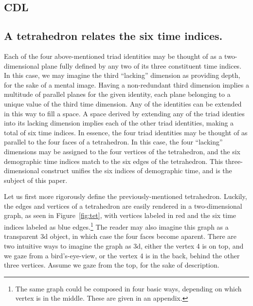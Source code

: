 \documentclass[11pt,oneside,a4paper]{article} %
\newcommand\vt[1]{\textcolor{rd}{#1}}
\newcommand\tgh[1]{\raisebox{-.25\height}{\texttt{[image: Figures/triadtable/triad\#1.pdf]}}}
\begin{document}
\subsection*{CDL \tgh{CDL}}


\subsection*{A tetrahedron relates the six time indices.}
Each of the four above-mentioned triad identities may be thought of as a
two-dimensional plane fully defined by any two of its three constituent time
indices.
In this case, we may imagine the third ``lacking'' dimension as providing
depth, for the sake of a mental image.
Having a non-redundant third dimension implies a multitude of parallel planes
for the given identity, each plane belonging to a unique value of the third time dimension. Any of the
identities can be extended in this way to fill a space. A space derived by
extending any of the triad identies into its lacking dimension implies each of the
other triad identities, making a total of six time indices. In essence, the
four triad identities may be thought of as parallel to the four faces of a
tetrahedron. In this case, the four ``lacking'' dimensions may be assigned to
the four vertices of the tetrahedron, and the six demographic time indices match
to the six edges of the tetrahedron. This three-dimensional construct
unifies the six indices of demographic time, and is the subject of this paper.

Let us first more rigorously define the previously-mentioned tetrahedron.
Luckily, the edges and vertices of a tetrahedron are easily rendered in a
two-dimensional graph, as seen in Figure~\ref{fig:tet}, with vertices labeled
in red and the six time indices labeled as blue edges.\footnote{The same graph
could be composed in four basic ways, depending on which vertex is in the
middle. These are given in an appendix.} The reader may also imagine this graph
as a transparent 3d object, in which case the four faces become aparent. There are two intuitive ways to imagine the graph as 3d, either the vertex \vt{4} is on top, and we gaze from a bird's-eye-view, or the
vertex \vt{4} is in the back, behind the other three vertices. Assume we
gaze from the top, for the sake of description. 
\end{document}
